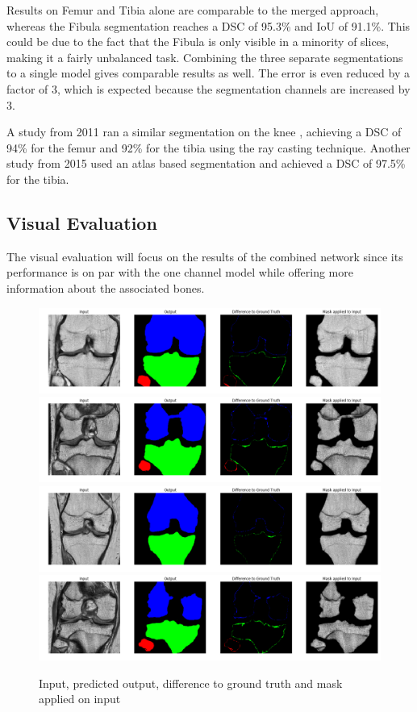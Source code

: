 Results on Femur and Tibia alone are comparable to the merged approach, whereas the Fibula segmentation reaches a DSC of 95.3\% and IoU of 91.1\%. This could be due to the fact that the Fibula is only visible in a minority of slices, making it a fairly unbalanced task. Combining the three separate segmentations to a single model gives comparable results as well. The error is even reduced by a factor of 3, which is expected because the segmentation channels are increased by 3.

A study from 2011 ran a similar segmentation on the knee \cite{Martel-Pelletier2011}, achieving a DSC of 94\% for the femur and 92\% for the tibia using the ray casting technique. Another study from 2015 \cite{Dam} used an atlas based segmentation and achieved a DSC of 97.5\% for the tibia.

\subsection{Visual Evaluation}

The visual evaluation will focus on the results of the combined network since its performance is on par with the one channel model while offering more information about the associated bones.

\begin{figure}[H]
\centering
\par
\includegraphics[width=1.0\textwidth]{imgs/sample1.png}
\includegraphics[width=1.0\textwidth]{imgs/sample2.png}
\includegraphics[width=1.0\textwidth]{imgs/sample4.png}
\includegraphics[width=1.0\textwidth]{imgs/sample3.png}
\caption{Input, predicted output, difference to ground truth and mask applied on input}
\par
\end{figure}

